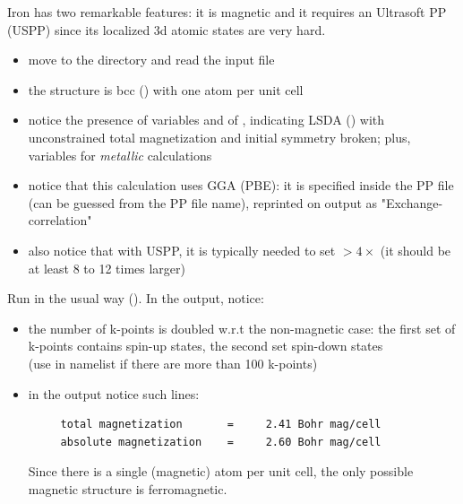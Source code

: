 \documentclass[landscape]{foils}
\begin{document}
%
Iron has two remarkable features: it is magnetic
and it requires an Ultrasoft PP (USPP) since its localized 3d atomic 
states are very hard.
\begin{itemize}
\item move to the  directory and read the
   input file 
\item the structure is bcc () with one atom per unit cell
\item notice the presence of variables  and 
of , indicating LSDA
() with unconstrained total magnetization and
initial symmetry broken; plus, variables for {\em metallic} calculations
\item notice that this calculation uses GGA (PBE): it is specified
inside the PP file (can be guessed from the PP file name),
reprinted on output as "Exchange-correlation"
\item also notice that with USPP, it is typically needed to set
 $ > 4 \times $
(it should be at least 8 to 12 times larger)
\end{itemize}

%
Run  in the usual way (). In the output, notice:
\begin{itemize}
\item the number of k-points is doubled w.r.t the non-magnetic case:
  the first set of k-points contains spin-up states, the second set
  spin-down states\\
  {\small (use  in namelist  if
    there are more than 100 k-points)}
\item in the output notice such lines:
  {\codecolor
\begin{verbatim}
     total magnetization       =     2.41 Bohr mag/cell
     absolute magnetization    =     2.60 Bohr mag/cell
\end{verbatim}
  }
  Since there is a single (magnetic) atom per unit cell, the only
  possible magnetic structure is ferromagnetic.
\end{itemize}
\end{document}
